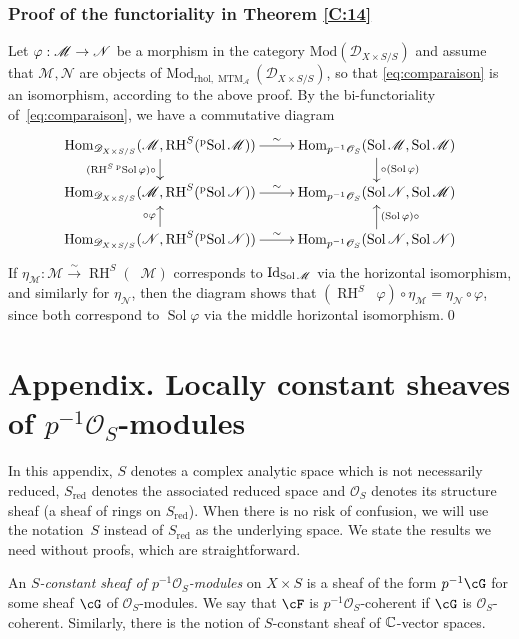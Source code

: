\documentclass[english]{smfart}
\numberwithin{subsection}{section}
\def\sha{\mathcal{A}}\let\cA\sha
\def\shd{\mathcal{D}}\let\cD\shd
\def\shm{\mathcal{M}}
\def\shn{\mathcal{N}}\let\shn\shn
\def\sho{\mathcal{O}}\let\cO\sho
\DeclareMathOperator{\RH}{RH}
\newcommand{\rhol}{\mathrm{rhol}}
\newcommand{\Mod}{\mathrm{Mod}}
\newcommand{\red}{\mathrm{red}}
\newcommand{\XS}{X\times S}
\newcommand{\DXS}{\shd_{\XS/S}}
\DeclareMathOperator{\Hom}{Hom}
\DeclareMathOperator{\MTM}{MTM}
\DeclareMathOperator{\Sol}{Sol}
\DeclareMathOperator{\pSol}{{}^\mathrm{p}Sol}
\newcommand{\pOS}{p^{-1}\sho_S}
\numberwithin{equation}{section}
\theoremstyle{plain}
\theoremstyle{definition}
\def\to{\mathchoice{\longrightarrow}{\rightarrow}{\rightarrow}{\rightarrow}}
\def\isom{\stackrel{\sim}{\longrightarrow}}
\begin{document}
\subsubsection*{Proof of the functoriality in Theorem \ref{C:14}}
Let $\varphi:\shm\to\shn$ be a morphism in the category $\Mod(\DXS)$ and assume that $\shm,\shn$ are objects of $\Mod_{\rhol,\MTM_\sha}(\DXS)$, so that \eqref{eq:comparaison} is an isomorphism, according to the above proof. By the bi-functoriality of~\eqref{eq:comparaison}, we have a commutative diagram
\[
\xymatrix@R=.5cm{
\Hom_{\DXS}(\shm, \RH^S(\pSol\shm))\ar[r]^-\sim\ar[d]_{(\RH^S\pSol\varphi)\circ{}}&\Hom_{\pOS}(\Sol\shm,\Sol\shm)\ar[d]^{\circ(\Sol\varphi)}\\
\Hom_{\DXS}(\shm, \RH^S(\pSol\shn))\ar[r]^-\sim&\Hom_{\pOS}(\Sol\shn,\Sol\shm)\\
\Hom_{\DXS}(\shn, \RH^S(\pSol\shn))\ar[r]^-\sim\ar[u]^{{}\circ\varphi}&\Hom_{\pOS}(\Sol\shn,\Sol\shn)\ar[u]_{(\Sol\varphi)\circ{}}
}
\]
If $\eta_\shm:\shm\isom\RH^S(\pSol\shm)$ corresponds to $\Id_{\Sol\shm}$ via the horizontal isomorphism, and similarly for $\eta_\shn$, then the diagram shows that $(\RH^S\pSol\varphi)\circ\eta_\shm=\eta_\shn\circ\varphi$, since both correspond to $\Sol\varphi$ via the middle horizontal isomorphism.\qed

\renewcommand{\thesection}{A}
\section*{Appendix. Locally constant sheaves of \texorpdfstring{$\pOS$}{pOS}-modules}

In this appendix, $S$ denotes a complex analytic space which is not necessarily reduced, $S_\red$ denotes the associated reduced space and $\sho_S$ denotes its structure sheaf (a sheaf of rings on $S_\red$). When there is no risk of confusion, we will use the notation~$S$ instead of $S_\red$ as the underlying space. We state the results we need without proofs, which are straightforward.

\begin{comment}
\subsection{$S$-constant sheaves on $X$}
\end{comment}

An \emph{$S$-constant sheaf of $\pOS$-modules} on $\XS$ is a sheaf of the form $p^{-1}\cG$ for some sheaf $\cG$ of $\sho_S$-modules. We say that $\cF$ is $\pOS$-coherent if $\cG$ is $\sho_S$-coherent. Similarly, there is the notion of $S$-constant sheaf of $\mathbb{C}$-vector spaces.
\end{document}
